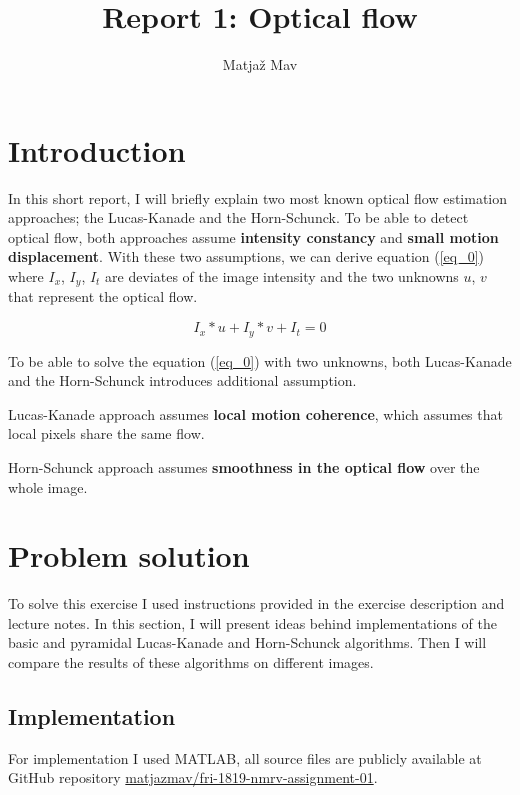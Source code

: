 \documentclass[runningheads]{llncs}
\begin{document}
% 
\title{Report 1: Optical flow}
\author{Matjaž Mav}
%
\maketitle              %
%

\section{Introduction}
In this short report, I will briefly explain two most known optical flow estimation approaches; the Lucas-Kanade and the Horn-Schunck. To be able to detect optical flow, both approaches assume \textbf{intensity constancy} and \textbf{small motion displacement}. With these two assumptions, we can derive equation (\ref{eq_0}) where $I_x$, $I_y$, $I_t$ are deviates of the image intensity and the two unknowns $u$, $v$ that represent the optical flow.

\begin{equation}
\label{eq_0}
I_x*u+I_y*v+I_t = 0
\end{equation}

To be able to solve the equation (\ref{eq_0}) with two unknowns, both Lucas-Kanade and the Horn-Schunck introduces additional assumption.

Lucas-Kanade approach assumes \textbf{local motion coherence}, which assumes that local pixels share the same flow.

Horn-Schunck approach assumes \textbf{smoothness in the optical flow} over the whole image.

\section{Problem solution}
To solve this exercise I used instructions provided in the exercise description and lecture notes. In this section, I will present ideas behind implementations of the basic and pyramidal Lucas-Kanade and Horn-Schunck algorithms. Then I will compare the results of these algorithms on different images.

\subsection{Implementation}
For implementation I used MATLAB, all source files are publicly available at GitHub repository \href{https://github.com/matjazmav/fri-1819-nmrv-assignment-01}{matjazmav/fri-1819-nmrv-assignment-01}.
\end{document}

